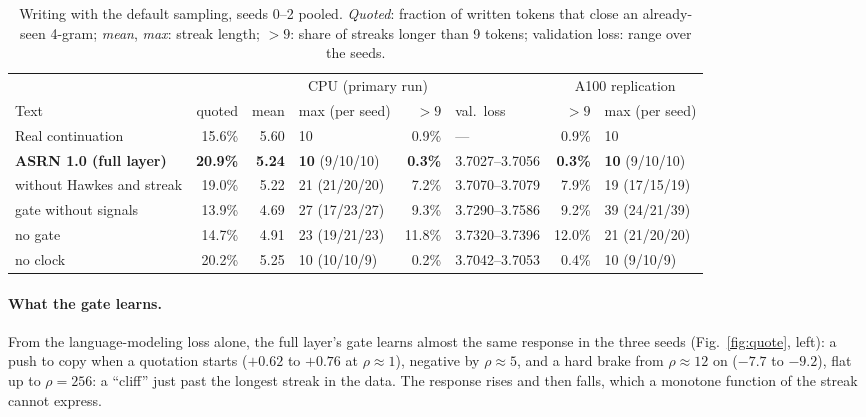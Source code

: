 \begin{table}[t]
\centering\small
\setlength{\tabcolsep}{3.3pt}
\begin{tabular}{lrrlrlrl}
\toprule
& \multicolumn{5}{c}{CPU (primary run)} & \multicolumn{2}{c}{A100 replication}\\
\cmidrule(lr){2-6}\cmidrule(lr){7-8}
Text & quoted & mean & max (per seed) & $>9$ & val.\ loss & $>9$ & max (per seed)\\
\midrule
Real continuation & 15.6\% & 5.60 & 10 & 0.9\% & --- & 0.9\% & 10\\
\textbf{ASRN 1.0 (full layer)} & \textbf{20.9\%} & \textbf{5.24} & \textbf{10} (9/10/10) & \textbf{0.3\%} &
3.7027--3.7056 & \textbf{0.3\%} & \textbf{10} (9/10/10)\\
without Hawkes and streak & 19.0\% & 5.22 & 21 (21/20/20) & 7.2\% & 3.7070--3.7079 & 7.9\% & 19 (17/15/19)\\
gate without signals & 13.9\% & 4.69 & 27 (17/23/27) & 9.3\% & 3.7290--3.7586 & 9.2\% & 39 (24/21/39)\\
no gate & 14.7\% & 4.91 & 23 (19/21/23) & 11.8\% & 3.7320--3.7396 & 12.0\% & 21 (21/20/20)\\
no clock & 20.2\% & 5.25 & 10 (10/10/9) & 0.2\% & 3.7042--3.7053 & 0.4\% & 10 (9/10/9)\\
\bottomrule
\end{tabular}
\caption{Writing with the default sampling, seeds 0--2 pooled. \emph{Quoted}: fraction of written tokens that close an
already-seen 4-gram; \emph{mean}, \emph{max}: streak length; $>9$: share of streaks longer than 9 tokens; validation
loss: range over the seeds.}
\label{tab:quote}
\end{table}

\paragraph{What the gate learns.} From the language-modeling loss alone, the full layer's gate learns almost the same
response in the three seeds (Fig.~\ref{fig:quote}, left): a push to copy when a quotation starts ($+0.62$ to $+0.76$ at
$\rho\approx1$), negative by $\rho\approx5$, and a hard brake from $\rho\approx12$ on ($-7.7$ to $-9.2$), flat up to
$\rho=256$: a ``cliff'' just past the longest streak in the data. The response rises and then falls, which a monotone
function of the streak cannot express.

